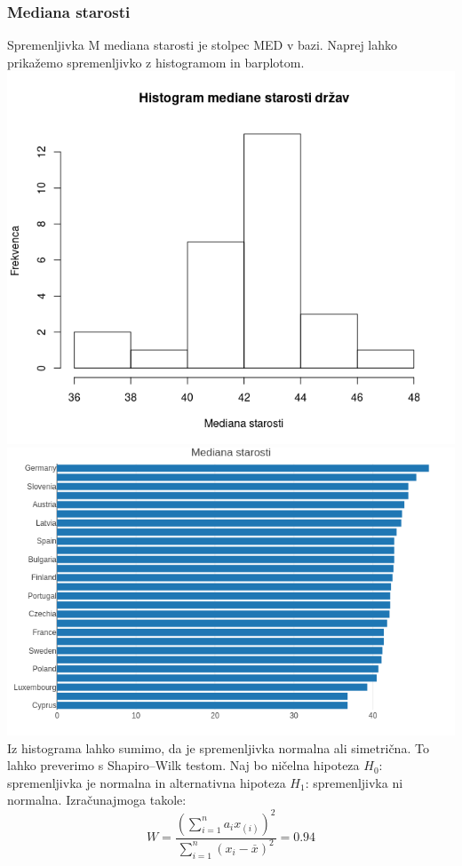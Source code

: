 \documentclass[a4paper,11pt]{article}
\begin{document}
\subsubsection{Mediana starosti}
Spremenljivka M mediana starosti je stolpec MED v bazi. Naprej lahko prikažemo spremenljivko z histogramom in barplotom.
\includegraphics[scale=0.6]{histogram_mediane_starosti}
\includegraphics[scale=0.6]{barplot_mediane_starosti}
Iz histograma lahko sumimo, da je spremenljivka normalna ali simetrična. To lahko preverimo s Shapiro–Wilk testom. Naj bo ničelna hipoteza \(H_0\): spremenljivka je normalna in alternativna hipoteza \(H_1\): spremenljivka ni normalna. Izračunajmoga takole:
\[W = \frac{(\sum_{i = 1}^{n}a_i x_{(i)})^2}{\sum_{i = 1}^{n}(x_i - \overset{\_}{x})^2} = 0.94\]
\end{document}
